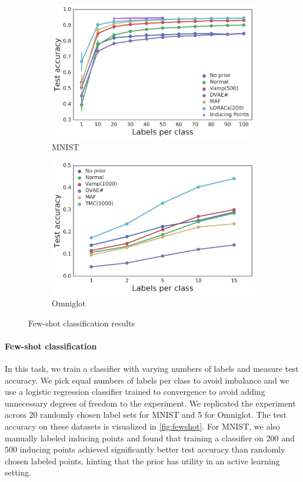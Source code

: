 \begin{figure}[t]
\centering
\begin{subfigure}[t]{0.4\textwidth}
    \centering
    \includegraphics[width=\textwidth]{img/loracs/mnist/cf-mnist.png}
    \caption{MNIST}
\end{subfigure}
\begin{subfigure}[t]{0.4\textwidth}
    \centering
    \includegraphics[width=\textwidth]{img/loracs/omniglot/cf-omniglot.png}
    \caption{Omniglot}
\end{subfigure}
\caption{Few-shot classification results}
\vspace{-0.5cm}
\label{fig:fewshot}
\end{figure}
\paragraph{Few-shot classification}
In this task,
we train a
classifier with
varying numbers of labels and measure
test accuracy. We pick
equal numbers of labels per class
to avoid imbalance and we use
a logistic regression classifier
trained to convergence to avoid
adding unnecessary degrees of freedom to the experiment.
We replicated the experiment across
20 randomly chosen label sets for MNIST
and 5 for Omniglot.
The test accuracy on
these datasets is visualized in 
\autoref{fig:fewshot}. For MNIST, we 
also manually labeled inducing points and
found that training a classifier on 200 and 500 inducing points
achieved significantly better test accuracy than 
randomly chosen labeled points, hinting that
the \acronym\;prior has utility in an active learning setting.

